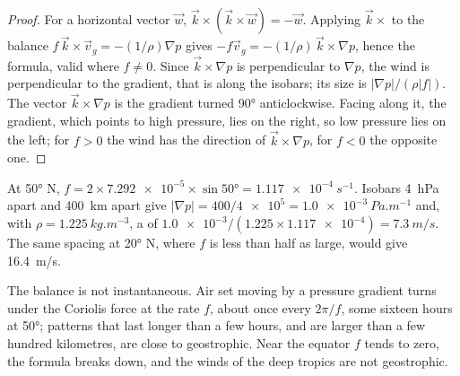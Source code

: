 \begin{proof}
For a horizontal vector $\vec w$, $\vec k\times(\vec k\times\vec w) = -\vec w$.
Applying $\vec k\times$ to the balance $f\,\vec k\times\vec v_g = -(1/\rho)\nabla p$
gives $-f\vec v_g = -(1/\rho)\,\vec k\times\nabla p$, hence the formula, valid where
$f \neq 0$. Since $\vec k\times\nabla p$ is perpendicular to $\nabla p$, the wind is
perpendicular to the gradient, that is along the isobars; its size is $|\nabla
p|/(\rho|f|)$. The vector $\vec k\times\nabla p$ is the gradient turned \ang{90}
anticlockwise. Facing along it, the gradient, which points to high pressure,
lies on the right, so low pressure lies on the left; for $f > 0$ the wind has the
direction of $\vec k\times\nabla p$, for $f < 0$ the opposite one.
\end{proof}

\begin{example}\label{ex:b1:atmospheric-circulation:geostrophic}
At \ang{50} N, $f = 2 \times \num{7.292e-5} \times \sin\ang{50} = \qty{1.117e-4}{s^{-1}}$.
Isobars \qty{4}{hPa} apart and \qty{400}{km} apart give $|\nabla p| = 400/\num{4e5} =
\qty{1.0e-3}{Pa.m^{-1}}$ and, with $\rho = \qty{1.225}{kg.m^{-3}}$, a  of $\num{1.0e-3}/(1.225 \times \num{1.117e-4}) = \qty{7.3}{m/s}$. The same
spacing at \ang{20} N, where $f$ is less than half as large, would give
\qty{16.4}{m/s}.
\end{example}

The balance is not instantaneous. Air set moving by a pressure gradient turns
under the Coriolis force at the rate $f$, about once every $2\pi/f$, some sixteen
hours at \ang{50}; patterns that last longer than a few hours, and are larger than a
few hundred kilometres, are close to geostrophic. Near the equator $f$ tends to
zero, the formula breaks down, and the winds of the deep tropics are not
geostrophic.

